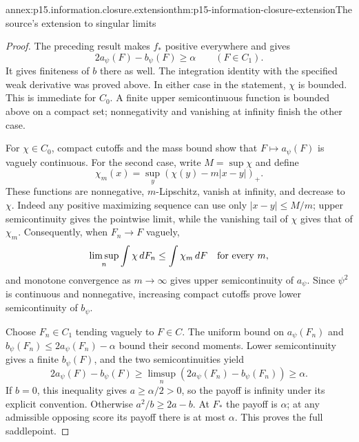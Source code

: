 \begin{annexitem}{annex:p15.information.closure.extension}{thm:p15-information-closure-extension}{The source's extension to singular limits}
\begin{proof}
The preceding result makes \(f_*\) positive everywhere and gives
\[
 2a_\psi(F)-b_\psi(F)\geq\alpha\qquad(F\in C_1).
\]
It gives finiteness of \(b\) there as well. The integration identity
with the specified weak derivative was proved above.
In either case in the statement, \(\chi\) is bounded. This is immediate
for \(C_0\). A finite upper semicontinuous function is bounded above
on a compact set; nonnegativity and vanishing at infinity finish
the other case.

For \(\chi\in C_0\), compact cutoffs and the mass bound show that
\(F\mapsto a_\psi(F)\) is vaguely continuous. For the second case,
write \(M=\sup\chi\) and define
\[
 \chi_m(x)=\sup_y(\chi(y)-m|x-y|)_+ .
\]
These functions are nonnegative, \(m\)-Lipschitz, vanish at infinity,
and decrease to \(\chi\). Indeed any positive maximizing sequence
can use only \(|x-y|\leq M/m\); upper semicontinuity gives the
pointwise limit, while the vanishing tail of \(\chi\) gives that
of \(\chi_m\). Consequently, when \(F_n\to F\) vaguely,
\[
 \limsup_n\int\chi\,dF_n
 \leq\int\chi_m\,dF\quad\hbox{for every }m,
\]
and monotone convergence as \(m\to\infty\) gives upper
semicontinuity of \(a_\psi\).
Since \(\psi^2\) is continuous and nonnegative, increasing compact
cutoffs prove lower semicontinuity of \(b_\psi\).

Choose \(F_n\in C_1\) tending vaguely to \(F\in C\).
The uniform bound on \(a_\psi(F_n)\) and
\(b_\psi(F_n)\leq2a_\psi(F_n)-\alpha\) bound their second moments.
Lower semicontinuity gives a finite \(b_\psi(F)\), and the two
semicontinuities yield
\[
 2a_\psi(F)-b_\psi(F)
 \geq\limsup_n(2a_\psi(F_n)-b_\psi(F_n))\geq\alpha .
\]
If \(b=0\), this inequality gives \(a\geq\alpha/2>0\), so the
payoff is infinity under its explicit convention. Otherwise
\(a^2/b\geq2a-b\). At \(F_*\) the payoff is \(\alpha\); at any
admissible opposing score its payoff there is at most \(\alpha\).
This proves the full saddlepoint.


\end{proof}
\end{annexitem}
